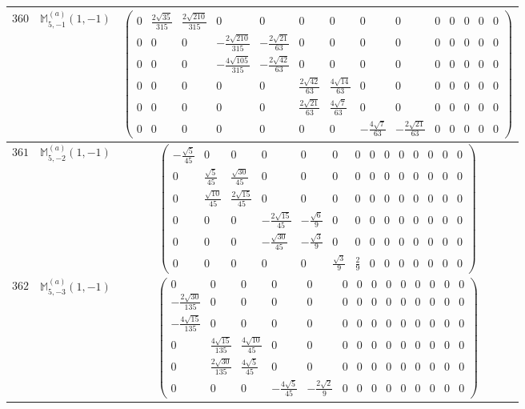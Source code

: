 \documentclass[fleqn,8pt,landscape]{jsarticle}
\begin{document}
\begin{center}
\begin{longtable}{ccc}
$ 360 $ & $ \mathbb{M}_{5,-1}^{(a)}(1,-1) $ & $ \begin{pmatrix} 0 & \frac{2 \sqrt{35}}{315} & \frac{2 \sqrt{210}}{315} & 0 & 0 & 0 & 0 & 0 & 0 & 0 & 0 & 0 & 0 & 0 \\ 0 & 0 & 0 & - \frac{2 \sqrt{210}}{315} & - \frac{2 \sqrt{21}}{63} & 0 & 0 & 0 & 0 & 0 & 0 & 0 & 0 & 0 \\ 0 & 0 & 0 & - \frac{4 \sqrt{105}}{315} & - \frac{2 \sqrt{42}}{63} & 0 & 0 & 0 & 0 & 0 & 0 & 0 & 0 & 0 \\ 0 & 0 & 0 & 0 & 0 & \frac{2 \sqrt{42}}{63} & \frac{4 \sqrt{14}}{63} & 0 & 0 & 0 & 0 & 0 & 0 & 0 \\ 0 & 0 & 0 & 0 & 0 & \frac{2 \sqrt{21}}{63} & \frac{4 \sqrt{7}}{63} & 0 & 0 & 0 & 0 & 0 & 0 & 0 \\ 0 & 0 & 0 & 0 & 0 & 0 & 0 & - \frac{4 \sqrt{7}}{63} & - \frac{2 \sqrt{21}}{63} & 0 & 0 & 0 & 0 & 0 \end{pmatrix} $ \\ \hline
$ 361 $ & $ \mathbb{M}_{5,-2}^{(a)}(1,-1) $ & $ \begin{pmatrix} - \frac{\sqrt{5}}{45} & 0 & 0 & 0 & 0 & 0 & 0 & 0 & 0 & 0 & 0 & 0 & 0 & 0 \\ 0 & \frac{\sqrt{5}}{45} & \frac{\sqrt{30}}{45} & 0 & 0 & 0 & 0 & 0 & 0 & 0 & 0 & 0 & 0 & 0 \\ 0 & \frac{\sqrt{10}}{45} & \frac{2 \sqrt{15}}{45} & 0 & 0 & 0 & 0 & 0 & 0 & 0 & 0 & 0 & 0 & 0 \\ 0 & 0 & 0 & - \frac{2 \sqrt{15}}{45} & - \frac{\sqrt{6}}{9} & 0 & 0 & 0 & 0 & 0 & 0 & 0 & 0 & 0 \\ 0 & 0 & 0 & - \frac{\sqrt{30}}{45} & - \frac{\sqrt{3}}{9} & 0 & 0 & 0 & 0 & 0 & 0 & 0 & 0 & 0 \\ 0 & 0 & 0 & 0 & 0 & \frac{\sqrt{3}}{9} & \frac{2}{9} & 0 & 0 & 0 & 0 & 0 & 0 & 0 \end{pmatrix} $ \\ \hline
$ 362 $ & $ \mathbb{M}_{5,-3}^{(a)}(1,-1) $ & $ \begin{pmatrix} 0 & 0 & 0 & 0 & 0 & 0 & 0 & 0 & 0 & 0 & 0 & 0 & 0 & 0 \\ - \frac{2 \sqrt{30}}{135} & 0 & 0 & 0 & 0 & 0 & 0 & 0 & 0 & 0 & 0 & 0 & 0 & 0 \\ - \frac{4 \sqrt{15}}{135} & 0 & 0 & 0 & 0 & 0 & 0 & 0 & 0 & 0 & 0 & 0 & 0 & 0 \\ 0 & \frac{4 \sqrt{15}}{135} & \frac{4 \sqrt{10}}{45} & 0 & 0 & 0 & 0 & 0 & 0 & 0 & 0 & 0 & 0 & 0 \\ 0 & \frac{2 \sqrt{30}}{135} & \frac{4 \sqrt{5}}{45} & 0 & 0 & 0 & 0 & 0 & 0 & 0 & 0 & 0 & 0 & 0 \\ 0 & 0 & 0 & - \frac{4 \sqrt{5}}{45} & - \frac{2 \sqrt{2}}{9} & 0 & 0 & 0 & 0 & 0 & 0 & 0 & 0 & 0 \end{pmatrix} $ \\ \hline

\end{longtable}
\end{center}
\end{document}
